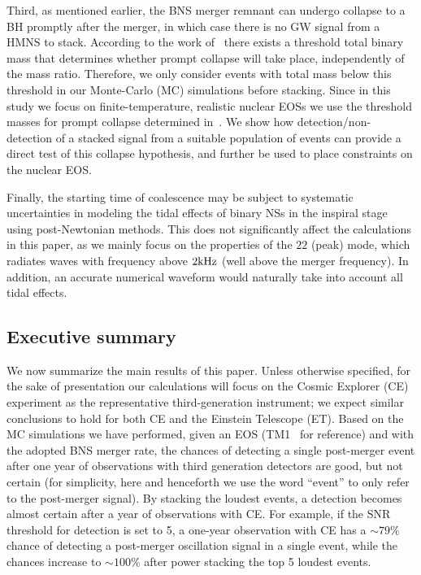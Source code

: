\documentclass[prd,aps,floatfix,superscriptaddress,nofootinbib,twocolumn,10pt,English]{revtex4-1}
\begin{document}
Third, as mentioned earlier, the BNS merger remnant can undergo
collapse to a BH promptly after the merger, in which case there is no
GW signal from a HMNS to stack. According to the work
of~\cite{Shibata:2006nm} there exists a threshold total binary mass
that determines whether prompt collapse will take place, independently
of the mass ratio. Therefore, we only consider events with total mass
below this threshold in our Monte-Carlo (MC) simulations before
stacking. Since in this study we focus on finite-temperature,
realistic nuclear EOSs we use the threshold masses for prompt collapse
determined in~\cite{bauswein2013prompt}. 
We show how detection/non-detection of a stacked signal
from a suitable population of events can provide a direct test of this
collapse hypothesis, and further be used to place constraints on the nuclear EOS.

Finally, the starting time of coalescence may be subject to systematic uncertainties in modeling the tidal
effects of binary NSs in the inspiral stage using post-Newtonian methods. This does not
significantly affect the calculations in this paper, as we mainly focus
on the properties of the $22$ (peak) mode, which radiates waves with
frequency above $2 \rm kHz$ (well above the merger
frequency). In addition, an accurate numerical waveform would naturally
take into account all tidal effects.

\subsection{Executive summary}



We now summarize the main results of this paper. Unless otherwise
specified, for the sake of presentation our calculations will focus on
the Cosmic Explorer (CE) experiment as the representative third-generation instrument;
we expect similar conclusions to hold for both CE and the Einstein Telescope (ET).  Based on
the MC simulations we have performed, given an EOS
(TM1~\cite{Hempel:2011mk} for reference) and with the adopted BNS
merger rate, the chances of detecting a single post-merger event after
 one year of observations with third
generation detectors are good, but not certain (for simplicity, here and henceforth we
use the word ``event'' to only refer to the post-merger signal).
By stacking the loudest events, a detection becomes almost certain after a
year of observations with CE. For example, if the SNR threshold for
detection is set to 5, a one-year observation with CE  has a
$\sim 79\%$ chance of detecting a post-merger oscillation signal in a
single event, while the chances increase to $\sim 100\%$ after power
stacking the top 5 loudest events.
\end{document}
